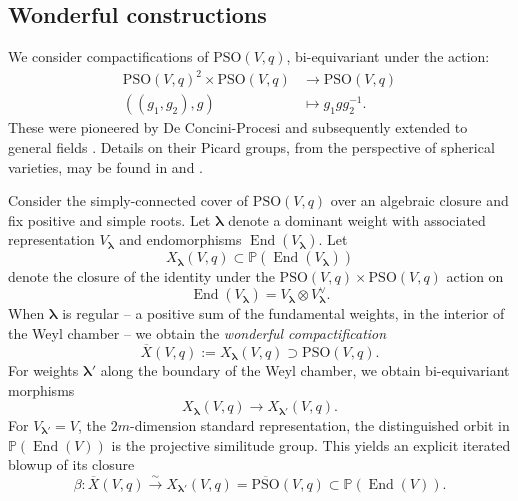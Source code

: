 \documentclass[12pt]{amsart}
\numberwithin{equation}{section}
\newcommand{\ra}{\rightarrow}
\newcommand{\blambda}{\boldsymbol{\lambda}}
\newcommand{\bP}{\mathbb{P}}
\newcommand{\End}{\operatorname{End}}
\newcommand{\oPSO}{\overline{\mathrm{PSO}}}
\newcommand{\PSO}{\mathrm{PSO}}
\theoremstyle{plain}
\theoremstyle{definition}
\theoremstyle{remark}
\begin{document}
\subsection*{Wonderful constructions}
We consider compactifications of $\PSO(V,q)$, bi-equivariant
under the action: 
\begin{align*}
\PSO(V,q)^2 \times \PSO(V,q) & \ra \PSO(V,q) \\
((g_1,g_2),g) & \mapsto g_1gg_2^{-1}.
\end{align*}
These were pioneered by De Concini-Procesi \cite{DP}
and subsequently extended to general fields \cite{Str,DS}.
Details on their Picard groups, from
the perspective of spherical varieties,
may be found in \cite{Brion} and \cite{BrionTotal}.
 

Consider the simply-connected cover of $\PSO(V,q)$ 
over an algebraic closure and fix positive and simple
roots. Let $\blambda$ denote a 
dominant weight with associated representation 
$V_{\blambda}$ and endomorphisms $\End(V_{\blambda})$. 
Let 
$$X_{\blambda}(V,q)\subset \bP(\End(V_{\blambda}))$$ 
denote the closure of the identity under the 
$\PSO(V,q) \times \PSO(V,q)$ action on 
$$\End(V_{\blambda})=V_{\blambda} \otimes V_{\blambda}^{\vee}.$$ 
When $\blambda$ is regular -- a positive sum of the
fundamental weights, in the interior of the Weyl chamber -- we obtain the {\em wonderful compactification} \cite[3.4]{DP}
$$\overline{X}(V,q):=X_{\blambda}(V,q) \supset\PSO(V,q).$$ 
For weights $\blambda'$ 
along the boundary of the Weyl chamber, we obtain bi-equivariant morphisms
$$X_{\blambda}(V,q) \ra X_{\blambda'}(V,q).$$
For $V_{\blambda'}=V$, the
$2m$-dimension standard representation,
the distinguished orbit in $\bP(\End(V))$ is the
projective similitude group. 
This yields an explicit iterated blowup of its closure
$$\beta: \overline{X}(V,q)\stackrel{\sim}{\longrightarrow} X_{\blambda'}(V,q)=\oPSO(V,q) \subset \bP(\End(V)).$$  
\end{document}
